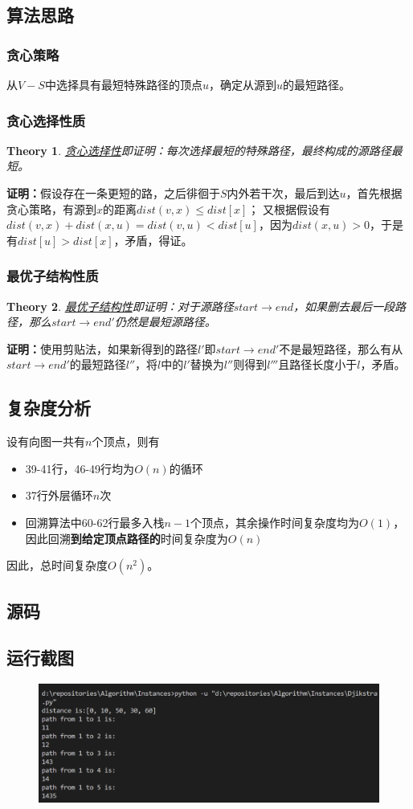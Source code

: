\documentclass{ctexart}[UTF8]
\newtheorem{theorem}{Theory}[section]
\begin{document}
    \subsection{算法思路}
    \subsubsection{贪心策略}
    从$V-S$中选择具有最短特殊路径的顶点$u$，确定从源到$u$的最短路径。
    \subsubsection{贪心选择性质}
    \begin{theorem}
        \underline{贪心选择性}即证明：每次选择最短的特殊路径，最终构成的源路径最短。
    \end{theorem}
    \textbf{证明：}假设存在一条更短的路，之后徘徊于$S$内外若干次，最后到达$u$，首先根据贪心策略，有源到$x$的距离$dist(v,x) \le dist[x]$；
    又根据假设有$dist(v,x) + dist(x,u) = dist(v,u) < dist[u]$，因为$dist(x,u) > 0$，于是有$dist[u] > dist[x]$，矛盾，得证。
    \subsubsection{最优子结构性质}
    \begin{theorem}
        \underline{最优子结构性}即证明：对于源路径$start\rightarrow end$，如果删去最后一段路径，那么$start\rightarrow end'$仍然是最短源路径。 
    \end{theorem}
    \textbf{证明：}使用剪贴法，如果新得到的路径$l'$即$start\rightarrow end'$不是最短路径，那么有从$start\rightarrow end'$的最短路径$l''$，将$l$中的$l'$替换为$l''$则得到$l'''$且路径长度小于$l$，矛盾。
    \subsection{复杂度分析}
    设有向图一共有$n$个顶点，则有 \begin{itemize}
        \item 39-41行，46-49行均为$O(n)$的循环
        \item 37行外层循环$n$次
        \item 回溯算法中60-62行最多入栈$n-1$个顶点，其余操作时间复杂度均为$O(1)$，因此回溯\textbf{到给定顶点路径的}时间复杂度为$O(n)$
    \end{itemize}
    \par 因此，总时间复杂度$O(n^2)$。
    \subsection{源码}
    
    \subsection{运行截图}
    \begin{figure}[H]
        \centering
        \includegraphics[width=14cm]{resources/10_2.png}
    \end{figure}
\end{document}
